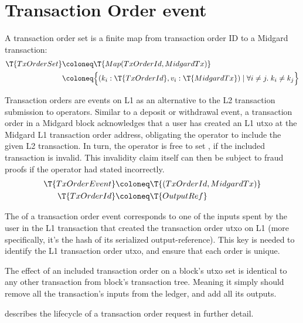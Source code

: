 \documentclass[../midgard.tex]{subfiles}
\begin{document}
\section{Transaction Order event}
\label{h:transaction-order-event}

A transaction order set is a finite map from transaction order ID to a Midgard transaction:
\begin{align*}
    \T{TxOrderSet} &\coloneq \T{Map(TxOrderId, MidgardTx)} \\
      &\coloneq \Bigl\{
        (k_i: \T{TxOrderId}, v_i: \T{MidgardTx}) \mid \forall i \neq j.\; k_i \neq k_j
    \Bigr\}
\end{align*}

Transaction orders are events on L1 as an alternative to the L2 transaction submission to operators.
Similar to a deposit or withdrawal event, a transaction order in a Midgard block acknowledges that a user has created an L1 utxo at the Midgard L1 transaction order address, obligating the operator to include the given L2 transaction.
In turn, the operator is free to set , if the included transaction is invalid.
This invalidity claim itself can then be subject to fraud proofs if the operator had stated incorrectly.
\begingroup
\allowdisplaybreaks{}
\begin{align*}
    \T{TxOrderEvent} &\coloneq \T{(TxOrderId, MidgardTx)} \\
    \T{TxOrderId} &\coloneq \T{OutputRef}
\end{align*}
\endgroup

The  of a transaction order event corresponds to one of the inputs spent by the user in the L1 transaction that created the transaction order utxo on L1 (more specifically, it's the hash of its serialized output-reference).
This key is needed to identify the L1 transaction order utxo, and ensure that each order is unique.

The effect of an included transaction order on a block's utxo set is identical to any other transaction from block's transaction tree.
Meaning it simply should remove all the transaction's inputs from the ledger, and add all its outputs.

 describes the lifecycle of a transaction order request in further detail.
\end{document}
